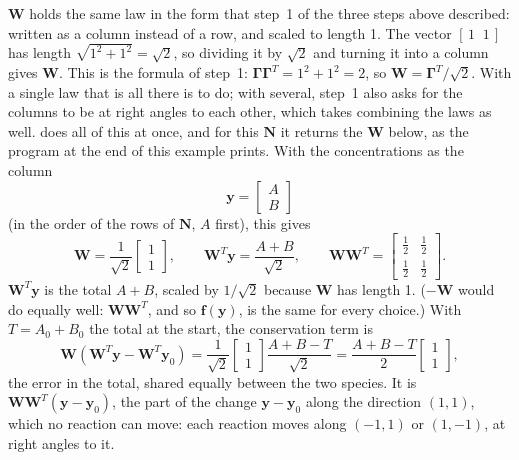 \documentclass[11pt,a4paper,openany]{report}
\begin{document}
{{$\mathbf{W}$ holds the same law in the form that step~1 of the three steps
above described: written as a column instead of a row, and scaled to length
1. The vector $[\,1 \;\; 1\,]$ has length $\sqrt{1^2 + 1^2} = \sqrt{2}$, so
dividing it by $\sqrt{2}$ and turning it into a column gives $\mathbf{W}$.
This is the formula of step~1: $\mathbf{\Gamma}\mathbf{\Gamma}^T = 1^2 + 1^2
= 2$, so $\mathbf{W} = \mathbf{\Gamma}^T / \sqrt{2}$. With a single law that is all there is to do; with several, step~1 also
asks for the columns to be at right angles to each other, which takes
combining the laws as well.  does all of this at
once, and for this $\mathbf{N}$ it returns the $\mathbf{W}$ below, as the
program at the end of this example prints. With the concentrations as the
column
\[
  \mathbf{y} = \begin{bmatrix} A \\ B \end{bmatrix}
\]
(in the order of the rows of $\mathbf{N}$, $A$ first), this gives
\[
  \mathbf{W} = \frac{1}{\sqrt{2}} \begin{bmatrix} 1 \\ 1 \end{bmatrix} ,
  \qquad
  \mathbf{W}^T \mathbf{y} = \frac{A + B}{\sqrt{2}} ,
  \qquad
  \mathbf{W} \mathbf{W}^T = \begin{bmatrix} \tfrac12 & \tfrac12 \\[2pt]
    \tfrac12 & \tfrac12 \end{bmatrix} .
\]
$\mathbf{W}^T \mathbf{y}$ is the total $A + B$, scaled by $1/\sqrt{2}$ because
$\mathbf{W}$ has length 1. ($-\mathbf{W}$ would do equally well:
$\mathbf{W}\mathbf{W}^T$, and so $\mathbf{f}(\mathbf{y})$, is the same for every choice.) With
$T = A_0 + B_0$ the total at the start, the conservation term is
\[
  \mathbf{W} (\mathbf{W}^T \mathbf{y} - \mathbf{W}^T \mathbf{y}_0)
  = \frac{1}{\sqrt{2}} \begin{bmatrix} 1 \\ 1 \end{bmatrix}
    \frac{A + B - T}{\sqrt{2}}
  = \frac{A + B - T}{2} \begin{bmatrix} 1 \\ 1 \end{bmatrix} ,
\]
the error in the total, shared equally between the two species. It is
$\mathbf{W}\mathbf{W}^T(\mathbf{y} - \mathbf{y}_0)$, the part of the change $\mathbf{y} - \mathbf{y}_0$ along
the direction $(1, 1)$, which no reaction can move: each reaction moves
along $(-1, 1)$ or $(1, -1)$, at right angles to it.

}}
\end{document}
